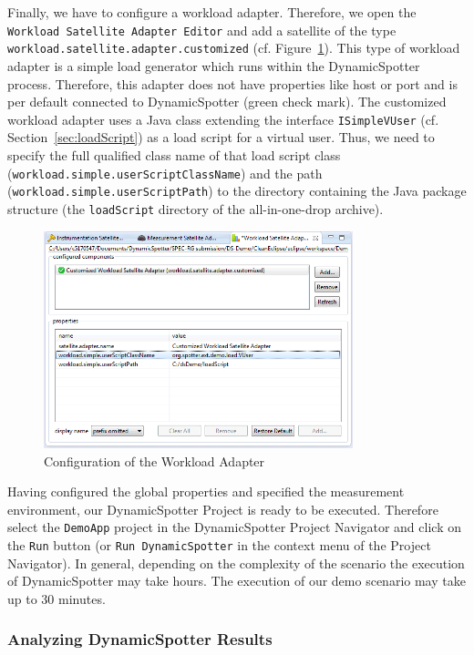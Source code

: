 \documentclass{report}
\newcommand{\DS}{DynamicSpotter }
\begin{document}
Finally, we have to configure a workload adapter. Therefore, we open the \texttt{Workload Satellite Adapter Editor} and
add a satellite of the type \texttt{workload.satellite.adapter.customized} (cf. Figure~\ref{fig:workloadConfig}). This
type of workload adapter is a simple load generator which runs within the \DS process. Therefore, this adapter does not have properties like host or port and
is per default connected to \DS (green check mark). The customized workload adapter uses a Java class extending the
interface \texttt{ISimpleVUser} (cf. Section~\ref{sec:loadScript}) as a load script for a virtual user. Thus, we need to
specify the full qualified class name of that load script class (\texttt{workload.simple.userScriptClassName}) and the
path (\texttt{workload.simple.userScriptPath}) to the directory containing the Java package structure (the
\texttt{loadScript} directory of the all-in-one-drop archive).

\begin{figure}[h]
\centering
\includegraphics[width=0.8\textwidth]{figures/demo/0012-workloadConfig.png}
\caption{Configuration of the Workload Adapter}
\label{fig:workloadConfig}
\end{figure}

Having configured the global properties and specified the measurement environment, our \DS Project is ready to be
executed. Therefore select the \texttt{DemoApp} project in the \DS Project Navigator and click on the \texttt{Run}
button (or \texttt{Run DynamicSpotter} in the context menu of the Project Navigator).
In general, depending on the complexity of the scenario the execution of \DS may take hours. The execution of our demo
scenario may take up to 30 minutes. 

\subsubsection{Analyzing \DS Results}
\end{document}
